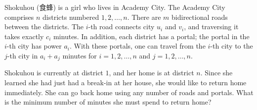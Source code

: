 Shokuhou (食蜂) is a girl who lives in Academy City.
The Academy City comprises $n$ districts numbered $1,2,\ldots,n$.
There are $m$ bidirectional roads between the districts.
The $i$-th road connects city $u_i$ and $v_i$, and traversing it takes exactly $c_i$ minutes.
In addition, each district has a portal; the portal in the $i$-th city has power $a_i$.
With these portals, one can travel from the $i$-th city to the $j$-th city in $a_i+a_j$ minutes for $i=1,2,\ldots,n$ and $j=1,2,\ldots,n$. 

Shokuhou is currently at district $1$, and her home is at district $n$.
Since she learned she had just had a break-in at her house, she would like to return home immediately.
She can go back home using any number of roads and portals.
What is the minimum number of minutes she must spend to return home?